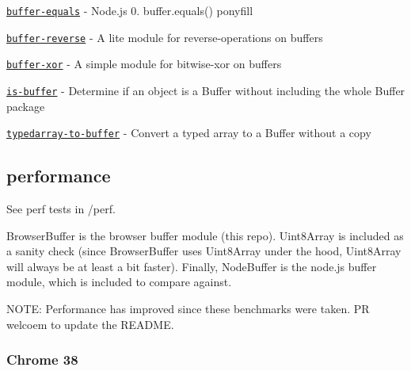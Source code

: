 \begin{DoxyItemize}
\item \href{https://www.npmjs.com/package/buffer-equals}{\tt {\ttfamily buffer-\/equals}} -\/ Node.\+js 0. buffer.\+equals() ponyfill
\item \href{https://www.npmjs.com/package/buffer-reverse}{\tt {\ttfamily buffer-\/reverse}} -\/ A lite module for reverse-\/operations on buffers
\item \href{https://www.npmjs.com/package/buffer-xor}{\tt {\ttfamily buffer-\/xor}} -\/ A simple module for bitwise-\/xor on buffers
\item \href{https://www.npmjs.com/package/is-buffer}{\tt {\ttfamily is-\/buffer}} -\/ Determine if an object is a Buffer without including the whole {\ttfamily Buffer} package
\item \href{https://www.npmjs.com/package/typedarray-to-buffer}{\tt {\ttfamily typedarray-\/to-\/buffer}} -\/ Convert a typed array to a Buffer without a copy
\end{DoxyItemize}

\subsection*{performance}

See perf tests in {\ttfamily /perf}.

{\ttfamily Browser\+Buffer} is the browser {\ttfamily buffer} module (this repo). {\ttfamily Uint8\+Array} is included as a sanity check (since {\ttfamily Browser\+Buffer} uses {\ttfamily Uint8\+Array} under the hood, {\ttfamily Uint8\+Array} will always be at least a bit faster). Finally, {\ttfamily Node\+Buffer} is the node.\+js buffer module, which is included to compare against.

N\+O\+TE\+: Performance has improved since these benchmarks were taken. PR welcoem to update the R\+E\+A\+D\+ME.

\subsubsection*{Chrome 38}


